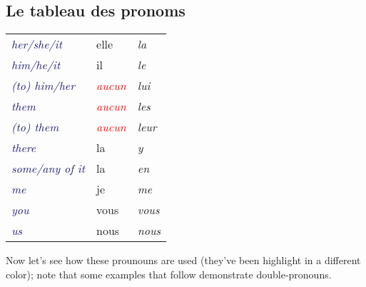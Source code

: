 \documentclass{microdoc} %
\newcommand\lEng[1]{\textcolor{MidnightBlue}{{\it #1}}}
\newcommand\lAucun{\it{\textcolor{Red}{aucun}}}
\newcommand\lPronom[1]{\emph{\textcolor{Mulberry}{#1}}}
\begin{document}
\subsection{Le tableau des pronoms}
\begin{table}[H]
    \begin{tabular}{l l l}
        \lEng{her/she/it}     & elle        & \lPronom{la}\\
        \lEng{him/he/it}      & il          & \lPronom{le}\\
        \lEng{(to) him/her}   & \lAucun     & \lPronom{lui}\\
        \lEng{them}           & \lAucun     & \lPronom{les}\\
        \lEng{(to) them}      & \lAucun     & \lPronom{leur}\\
        \lEng{there}          & la          & \lPronom{y}\\
        \lEng{some/any of it} & la          & \lPronom{en}\\
        \lEng{me}             & je          & \lPronom{me}\\
        \lEng{you}            & vous        & \lPronom{vous}\\
        \lEng{us}             & nous        & \lPronom{nous}\\
    \end{tabular}
\end{table}

Now let's see how these prounouns are used (they've been highlight in a
different color); note that some examples that follow demonstrate
double-pronouns.
\end{document}
